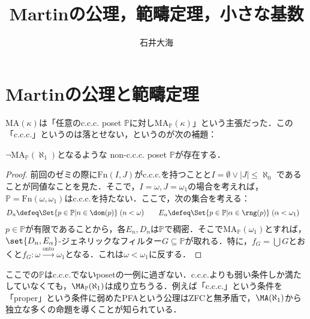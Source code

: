 \documentclass[a4j]{ltjsarticle}
\title{Martinの公理，範疇定理，小さな基数}
\author{石井大海}
\theoremstyle{definition}
\begin{document}
\maketitle
\section{Martinの公理と範疇定理}
$\mathrm{MA}(\kappa)$は「任意のc.c.c. poset $\mathbb{P}$に対し$\mathrm{MA}_\mathbb{P}(\kappa)$」という主張だった．この「c.c.c.」というのは落とせない，というのが次の補題：

\begin{lemma}
 $\neg \mathrm{MA}_{\mathbb{P}}(\aleph_1)$となるような non-c.c.c. poset $\mathbb{P}$が存在する．
\end{lemma}
\begin{proof}
 前回のゼミの際に$\mathrm{Fn}(I, J)$がc.c.c.を持つことと$I = \emptyset \vee |J| \leq \aleph_0$ であることが同値なことを見た．そこで，$I = \omega, J = \omega_1$の場合を考えれば，$\mathbb{P} = \mathrm{Fn}(\omega, \omega_1)$はc.c.c.を持たない．ここで，次の集合を考える：
 \begin{align*}
  D_n \defeq \Set{ p \in \mathbb{P} | n \in \dom(p)} & \;(n < \omega) & \quad E_\alpha \defeq \Set{ p \in \mathbb{P} | \alpha \in \rng(p)} & \; (\alpha < \omega_1)
 \end{align*}
 $p \in \mathbb{P}$が有限であることから，各$E_n, D_n$は$\mathbb{P}$で稠密．そこで$\mathrm{MA}_{\mathbb{P}}(\omega_1)$とすれば，$\set{D_n, E_\alpha}$-ジェネリックなフィルター$G \subseteq \mathbb{P}$が取れる．特に，$f_G = \bigcup G$とおくと$f_G : \omega \xrightarrow{\text{onto}} \omega_1$となる．これは$\omega < \omega_1$に反する．\mbox{}
\end{proof}

ここでの$\mathbb{P}$はc.c.c.でないposetの一例に過ぎない．c.c.c.よりも弱い条件しか満たしていなくても，$\MA_\mathbb{P}(\aleph_1)$は成り立ちうる．例えば「c.c.c.」という条件を「proper」という条件に弱めたPFAという公理はZFCと無矛盾で，$\MA(\aleph_1)$から独立な多くの命題を導くことが知られている．
\end{document}
